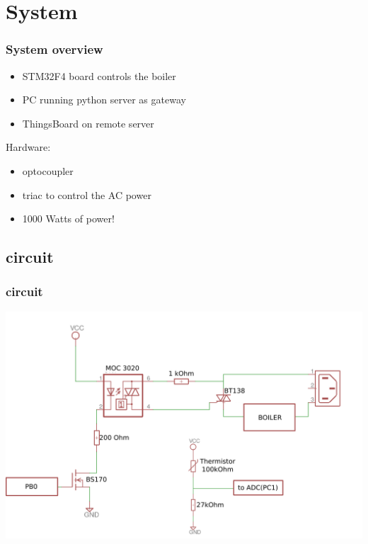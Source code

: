 \documentclass[12pt]{beamer}
\begin{document}
\section{System}
\begin{frame}
    \frametitle{System overview}
    
    \begin{itemize}
        \item STM32F4 board controls the boiler
        \item PC running python server as gateway
        \item ThingsBoard on remote server
    \end{itemize}
    Hardware:
    \begin{itemize}
        \item optocoupler
        \item triac to control the AC power
        \item 1000 Watts of power!
    \end{itemize}

\end{frame}
\subsection{circuit}
\begin{frame}
    \frametitle{circuit}
    \includegraphics[width=\textwidth]{eagle.png}
\end{frame}
\end{document}
